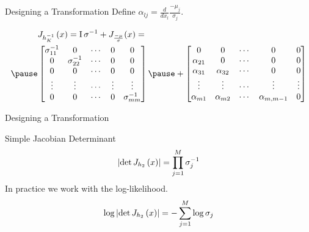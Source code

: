 \documentclass[14pt]{beamer}
\begin{document}
\begin{frame}{Designing a Transformation}
Define $ \alpha_{lj} = \frac{d}{dx_{l}}\frac{-\mu_{j}}{\sigma_{j}} $.
\begin{small}
\begin{equation*}
\begin{aligned}
&\jac{h_{K}^{-1}}{x} = \IMatrix\sigma^{-1} + J_{\frac{-\mu}{\sigma}}(x) = \\ \pause
&\begin{bmatrix}
\sigma^{-1}_{11} & 0 & \cdots & 0 & 0 \\
0 & \sigma^{-1}_{22} & \cdots & 0 & 0 \\
0 & 0 & \cdots & 0 & 0 \\
\vdots & \vdots & \cdots & \vdots & \vdots \\
0 & 0 & \cdots & 0 & \sigma^{-1}_{mm}
\end{bmatrix}
\pause
+
\begin{bmatrix}
0 & 0 & \cdots & 0 & 0 \\
\alpha_{21} & 0 & \cdots & 0 & 0 \\
\alpha_{31} & \alpha_{32} & \cdots & 0 & 0 \\
\vdots & \vdots & \cdots & \vdots & \vdots \\
\alpha_{m1} & \alpha_{m2} & \cdots & \alpha_{m,m-1} & 0
\end{bmatrix}
\end{aligned}
\end{equation*}
\end{small}
\end{frame}

\begin{frame}{Designing a Transformation}
\begin{block}{Simple Jacobian Determinant}
\begin{equation*}
\left|\det J_{h_{2}}\left(x\right)\right| = \prod_{j=1}^{M}\sigma^{-1}_{j}
\end{equation*}
\pause
In practice we work with the log-likelihood.
\begin{equation*}
\log\left|\det J_{h_{2}}\left(x\right)\right| = -\sum_{j=1}^{M}\log\sigma_{j}
\end{equation*}
\end{block}
\end{frame}
\end{document}
